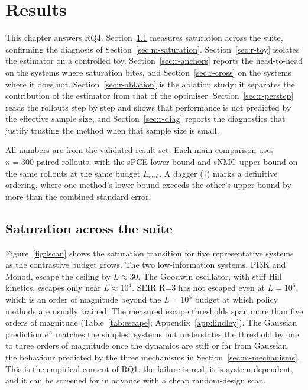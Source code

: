 \chapter{Results}
\label{sec:results}

This chapter answers RQ4. Section~\ref{sec:r-saturation} measures saturation across
the suite, confirming the diagnosis of Section~\ref{sec:m-saturation}.
Section~\ref{sec:r-toy} isolates the estimator on a controlled toy.
Section~\ref{sec:r-anchors} reports the head-to-head on the systems where saturation
bites, and Section~\ref{sec:r-cross} on the systems where it does not.
Section~\ref{sec:r-ablation} is the ablation study: it separates the contribution of
the estimator from that of the optimiser. Section~\ref{sec:r-perstep} reads the
rollouts step by step and shows that performance is not predicted by the effective
sample size, and Section~\ref{sec:r-diag} reports the diagnostics that justify
trusting the method when that sample size is small.

All numbers are from the validated result set. Each main comparison uses $n=300$
paired rollouts, with the sPCE lower bound and sNMC upper bound on the same rollouts
at the same budget $L_{\mathrm{eval}}$. A dagger ($\dagger$) marks a definitive
ordering, where one method's lower bound exceeds the other's upper bound by more than
the combined standard error.

\section{Saturation across the suite}
\label{sec:r-saturation}

Figure~\ref{fig:lscan} shows the saturation transition for five representative
systems as the contrastive budget grows. The two low-information systems, PI3K and
Monod, escape the ceiling by $L\approx30$. The Goodwin oscillator, with stiff Hill
kinetics, escapes only near $L\approx10^4$. SEIR R=3 has not escaped even at $L=10^6$,
which is an order of magnitude beyond the $L=10^5$ budget at which policy methods are
usually trained. The measured escape thresholds span more than five orders of
magnitude (Table~\ref{tab:escape}; Appendix~\ref{app:lindley}). The Gaussian
prediction $e^{\Lambda}$ matches the simplest systems but understates the threshold by
one to three orders of magnitude once the dynamics are stiff or far from Gaussian, the
behaviour predicted by the three mechanisms in Section~\ref{sec:m-mechanisms}. This is
the empirical content of RQ1: the failure is real, it is system-dependent, and it can
be screened for in advance with a cheap random-design scan.

